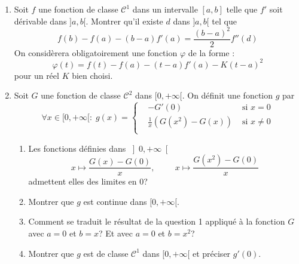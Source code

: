 \begin{enumerate}
 \item Soit $f$ une fonction de classe $\mathcal{C}^1$ dans un intervalle $[a,b]$ telle que $f'$ soit dérivable dans $]a,b[$. Montrer qu'il existe $d$ dans $]a,b[$ tel que
\begin{displaymath}
 f(b)-f(a)-(b-a)f'(a) = \frac{(b-a)^2}{2}f''(d)
\end{displaymath}
On considèrera obligatoirement une fonction $\varphi$ de la forme :
\begin{displaymath}
 \varphi(t) = f(t)-f(a)-(t-a)f'(a)-K(t-a)^2
\end{displaymath}
pour un réel $K$ bien choisi.
\item Soit $G$ une fonction de classe $\mathcal{C}^2$ dans $[0,+\infty[$. On définit une fonction $g$ par
\begin{displaymath}
 \forall x\in [0,+\infty[:\;
g(x)=
\left\lbrace
\begin{aligned}
 &-G'(0) &\text{ si } x=0 \\
 &\frac{1}{x}\left( G(x^2)-G(x)\right) &\text{ si } x\neq 0 \\
\end{aligned}
 \right. 
\end{displaymath}
\begin{enumerate}
 \item Les fonctions définies dans $\left] 0, + \infty\right[$ 
\begin{displaymath}
x \mapsto \frac{G(x) - G(0)}{x},\hspace{1cm} x \mapsto \frac{G(x^2) - G(0)}{x} 
\end{displaymath}
admettent elles des limites en $0$? 
 \item Montrer que $g$ est continue dans $[0,+\infty[$.
 \item Comment se traduit le résultat de la question 1 appliqué à la fonction $G$ avec $a=0$ et $b=x$? Et avec $a=0$ et $b=x^2$? 
 \item Montrer que $g$ est de classe $\mathcal C^1$ dans  $[0,+\infty[$ et préciser $g'(0)$.
\end{enumerate}

\end{enumerate}
